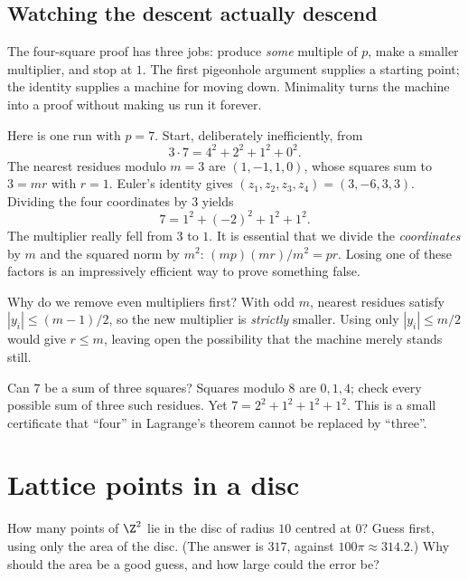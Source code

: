 \subsection*{Watching the descent actually descend}
The four-square proof has three jobs: produce \emph{some} multiple of $p$, make a smaller multiplier, and stop at $1$. The first pigeonhole argument supplies a starting point; the identity supplies a machine for moving down. Minimality turns the machine into a proof without making us run it forever.

Here is one run with $p=7$. Start, deliberately inefficiently, from
\[
3\cdot7=4^2+2^2+1^2+0^2.
\]
The nearest residues modulo $m=3$ are $(1,-1,1,0)$, whose squares sum to $3=mr$ with $r=1$. Euler's identity gives $(z_1,z_2,z_3,z_4)=(3,-6,3,3)$. Dividing the four coordinates by $3$ yields
\[
7=1^2+(-2)^2+1^2+1^2.
\]
The multiplier really fell from $3$ to $1$. It is essential that we divide the \emph{coordinates} by $m$ and the squared norm by $m^2$: $(mp)(mr)/m^2=pr$. Losing one of these factors is an impressively efficient way to prove something false.

Why do we remove even multipliers first? With odd $m$, nearest residues satisfy $|y_i|\le(m-1)/2$, so the new multiplier is \emph{strictly} smaller. Using only $|y_i|\le m/2$ would give $r\le m$, leaving open the possibility that the machine merely stands still.

\begin{think}
Can $7$ be a sum of three squares? Squares modulo $8$ are $0,1,4$; check every possible sum of three such residues. Yet $7=2^2+1^2+1^2+1^2$. This is a small certificate that ``four'' in Lagrange's theorem cannot be replaced by ``three''.
\end{think}

\section{Lattice points in a disc}

\begin{think}
How many points of $\Z^2$ lie in the disc of radius $10$ centred at $0$? Guess first, using only the area of the disc. (The answer is $317$, against $100\pi\approx314.2$.) Why should the area be a good guess, and how large could the error be?
\end{think}

